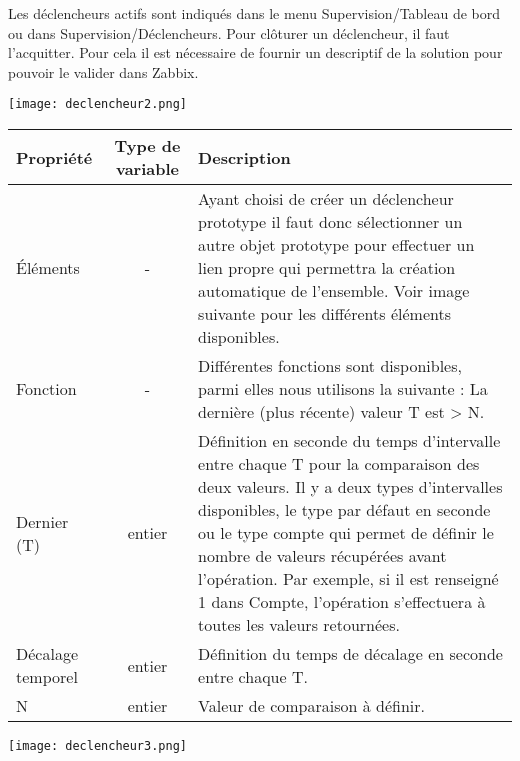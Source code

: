 	\vspace{0.3cm}

	Les déclencheurs actifs sont indiqués dans le menu Supervision/Tableau de bord ou dans Supervision/Déclencheurs. Pour clôturer un déclencheur, il faut l'acquitter. Pour cela il est nécessaire de fournir un descriptif de la solution pour pouvoir le valider dans Zabbix.\\

	\begin{center}
		\texttt{[image: declencheur2.png]}
		\vspace{0.3cm}
	\end{center}
	
	\begin{tabular}{|m{3cm}|c|m{10cm}|}
		\hline
		\bf Propriété & \bf Type de variable & \bf Description \\

		\hline
		Éléments & - & Ayant choisi de créer un déclencheur prototype il faut donc sélectionner un autre objet prototype pour effectuer un lien propre qui permettra la création automatique de l'ensemble. Voir image suivante pour les différents éléments disponibles. \\

		\hline
		Fonction & - & Différentes fonctions sont disponibles, parmi elles nous utilisons la suivante : La dernière (plus récente) valeur T est > N.\\

		\hline
		Dernier (T) & entier & Définition en seconde du temps d'intervalle entre chaque T pour la comparaison des deux valeurs. Il y a deux types d'intervalles disponibles, le type par défaut en seconde ou le type compte qui permet de définir le nombre de valeurs récupérées avant l'opération. Par exemple, si il est renseigné 1 dans Compte, l'opération s'effectuera à toutes les valeurs retournées.\\

		\hline
		Décalage temporel & entier & Définition du temps de décalage en seconde entre chaque T.\\

		\hline
		N & entier & Valeur de comparaison à définir.\\

		\hline
	\end{tabular}

	\vspace{0.3cm}

	\begin{center}
		\texttt{[image: declencheur3.png]}
		\vspace{0.3cm}
	\end{center}
	
